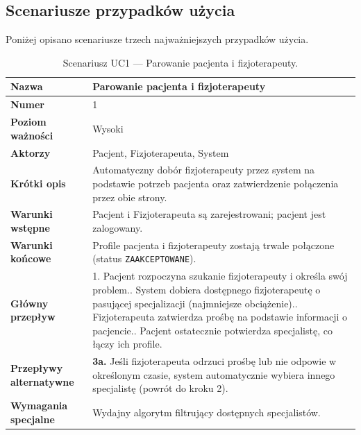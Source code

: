 \documentclass[11pt,a4paper]{article}
\begin{document}
\FloatBarrier
\subsection{Scenariusze przypadków użycia}
Poniżej opisano scenariusze trzech najważniejszych przypadków użycia.

\begin{table}[ht]
\small
\renewcommand{\arraystretch}{1.25}
\begin{tabularx}{\textwidth}{|>{\bfseries}p{}|Y|}
\hline
Nazwa & Parowanie pacjenta i fizjoterapeuty \\ \hline
Numer & 1 \\ \hline
Poziom ważności & Wysoki \\ \hline
Aktorzy & Pacjent, Fizjoterapeuta, System \\ \hline
Krótki opis & Automatyczny dobór fizjoterapeuty przez system na podstawie potrzeb pacjenta oraz zatwierdzenie połączenia przez obie strony. \\ \hline
Warunki wstępne & Pacjent i Fizjoterapeuta są zarejestrowani; pacjent jest zalogowany. \\ \hline
Warunki końcowe & Profile pacjenta i fizjoterapeuty zostają trwale połączone (status \texttt{ZAAKCEPTOWANE}). \\ \hline
Główny przepływ & 1. Pacjent rozpoczyna szukanie fizjoterapeuty i określa swój problem.. System dobiera dostępnego fizjoterapeutę o pasującej specjalizacji (najmniejsze obciążenie).. Fizjoterapeuta zatwierdza prośbę na podstawie informacji o pacjencie.. Pacjent ostatecznie potwierdza specjalistę, co łączy ich profile. \\ \hline
Przepływy alternatywne & \textbf{3a.} Jeśli fizjoterapeuta odrzuci prośbę lub nie odpowie w określonym czasie, system automatycznie wybiera innego specjalistę (powrót do kroku 2). \\ \hline
Wymagania specjalne & Wydajny algorytm filtrujący dostępnych specjalistów. \\ \hline
\end{tabularx}
\caption{Scenariusz UC1 — Parowanie pacjenta i fizjoterapeuty.}
\end{table}
\FloatBarrier
\end{document}
